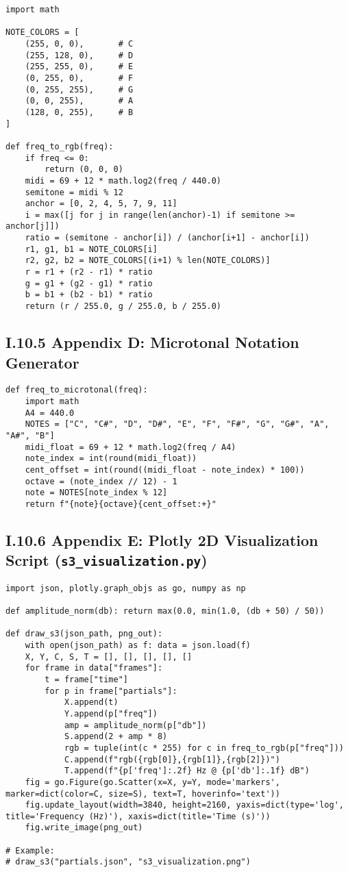 \begin{verbatim}
import math

NOTE_COLORS = [
    (255, 0, 0),       # C
    (255, 128, 0),     # D
    (255, 255, 0),     # E
    (0, 255, 0),       # F
    (0, 255, 255),     # G
    (0, 0, 255),       # A
    (128, 0, 255),     # B
]

def freq_to_rgb(freq):
    if freq <= 0:
        return (0, 0, 0)
    midi = 69 + 12 * math.log2(freq / 440.0)
    semitone = midi % 12
    anchor = [0, 2, 4, 5, 7, 9, 11]
    i = max([j for j in range(len(anchor)-1) if semitone >= anchor[j]])
    ratio = (semitone - anchor[i]) / (anchor[i+1] - anchor[i])
    r1, g1, b1 = NOTE_COLORS[i]
    r2, g2, b2 = NOTE_COLORS[(i+1) % len(NOTE_COLORS)]
    r = r1 + (r2 - r1) * ratio
    g = g1 + (g2 - g1) * ratio
    b = b1 + (b2 - b1) * ratio
    return (r / 255.0, g / 255.0, b / 255.0)
\end{verbatim}

\subsection*{I.10.5 Appendix D: Microtonal Notation Generator}

\begin{verbatim}
def freq_to_microtonal(freq):
    import math
    A4 = 440.0
    NOTES = ["C", "C#", "D", "D#", "E", "F", "F#", "G", "G#", "A", "A#", "B"]
    midi_float = 69 + 12 * math.log2(freq / A4)
    note_index = int(round(midi_float))
    cent_offset = int(round((midi_float - note_index) * 100))
    octave = (note_index // 12) - 1
    note = NOTES[note_index % 12]
    return f"{note}{octave}{cent_offset:+}"
\end{verbatim}

\subsection*{I.10.6 Appendix E: Plotly 2D Visualization Script (\texttt{s3\_visualization.py})}

\begin{verbatim}
import json, plotly.graph_objs as go, numpy as np

def amplitude_norm(db): return max(0.0, min(1.0, (db + 50) / 50))

def draw_s3(json_path, png_out):
    with open(json_path) as f: data = json.load(f)
    X, Y, C, S, T = [], [], [], [], []
    for frame in data["frames"]:
        t = frame["time"]
        for p in frame["partials"]:
            X.append(t)
            Y.append(p["freq"])
            amp = amplitude_norm(p["db"])
            S.append(2 + amp * 8)
            rgb = tuple(int(c * 255) for c in freq_to_rgb(p["freq"]))
            C.append(f"rgb({rgb[0]},{rgb[1]},{rgb[2]})")
            T.append(f"{p['freq']:.2f} Hz @ {p['db']:.1f} dB")
    fig = go.Figure(go.Scatter(x=X, y=Y, mode='markers', marker=dict(color=C, size=S), text=T, hoverinfo='text'))
    fig.update_layout(width=3840, height=2160, yaxis=dict(type='log', title='Frequency (Hz)'), xaxis=dict(title='Time (s)'))
    fig.write_image(png_out)

# Example:
# draw_s3("partials.json", "s3_visualization.png")
\end{verbatim}

